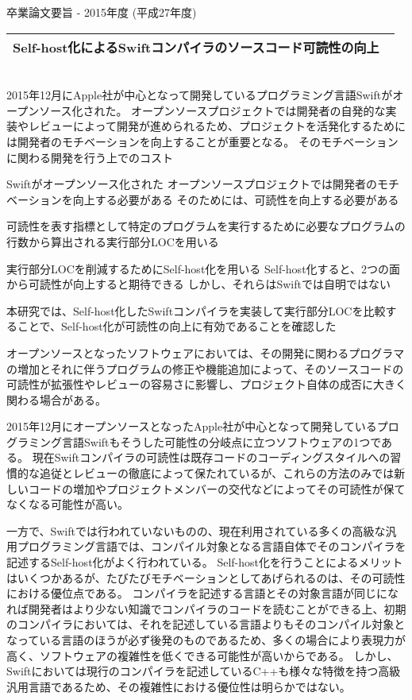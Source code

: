 卒業論文要旨 - 2015年度 (平成27年度)
\begin{center}
\begin{large}
\begin{tabular}{|M{0.97\linewidth}|}
    \hline
    Self-host化によるSwiftコンパイラのソースコード可読性の向上\\
    \hline
\end{tabular}
\end{large}
\end{center}

~ \\

2015年12月にApple社が中心となって開発しているプログラミング言語Swiftがオープンソース化された。
オープンソースプロジェクトでは開発者の自発的な実装やレビューによって開発が進められるため、プロジェクトを活発化するためには開発者のモチベーションを向上することが重要となる。
そのモチベーションに関わる開発を行う上でのコスト

Swiftがオープンソース化された
オープンソースプロジェクトでは開発者のモチベーションを向上する必要がある
そのためには、可読性を向上する必要がある

可読性を表す指標として特定のプログラムを実行するために必要なプログラムの行数から算出される実行部分LOCを用いる

実行部分LOCを削減するためにSelf-host化を用いる
Self-host化すると、2つの面から可読性が向上すると期待できる
しかし、それらはSwiftでは自明ではない

本研究では、Self-host化したSwiftコンパイラを実装して実行部分LOCを比較することで、Self-host化が可読性の向上に有効であることを確認した


オープンソースとなったソフトウェアにおいては、その開発に関わるプログラマの増加とそれに伴うプログラムの修正や機能追加によって、そのソースコードの可読性が拡張性やレビューの容易さに影響し、プロジェクト自体の成否に大きく関わる場合がある。

2015年12月にオープンソースとなったApple社が中心となって開発しているプログラミング言語Swiftもそうした可能性の分岐点に立つソフトウェアの1つである。
現在Swiftコンパイラの可読性は既存コードのコーディングスタイルへの習慣的な追従とレビューの徹底によって保たれているが、これらの方法のみでは新しいコードの増加やプロジェクトメンバーの交代などによってその可読性が保てなくなる可能性が高い。

一方で、Swiftでは行われていないものの、現在利用されている多くの高級な汎用プログラミング言語では、コンパイル対象となる言語自体でそのコンパイラを記述するSelf-host化がよく行われている。
Self-host化を行うことによるメリットはいくつかあるが、たびたびモチベーションとしてあげられるのは、その可読性における優位点である。
コンパイラを記述する言語とその対象言語が同じになれば開発者はより少ない知識でコンパイラのコードを読むことができる上、初期のコンパイラにおいては、それを記述している言語よりもそのコンパイル対象となっている言語のほうが必ず後発のものであるため、多くの場合により表現力が高く、ソフトウェアの複雑性を低くできる可能性が高いからである。
しかし、Swiftにおいては現行のコンパイラを記述しているC++も様々な特徴を持つ高級汎用言語であるため、その複雑性における優位性は明らかではない。

